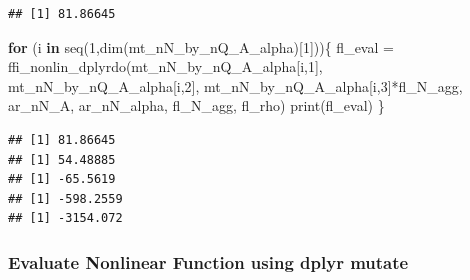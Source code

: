 \documentclass[
]{book}
\newenvironment{Shaded}{\begin{snugshade}}{\end{snugshade}}
\newcommand{\ControlFlowTok}[1]{\textcolor[rgb]{0.13,0.29,0.53}{\textbf{#1}}}
\newcommand{\DecValTok}[1]{\textcolor[rgb]{0.00,0.00,0.81}{#1}}
\newcommand{\FunctionTok}[1]{\textcolor[rgb]{0.00,0.00,0.00}{#1}}
\newcommand{\NormalTok}[1]{#1}
\newcommand{\OtherTok}[1]{\textcolor[rgb]{0.56,0.35,0.01}{#1}}
\newcommand{\SpecialCharTok}[1]{\textcolor[rgb]{0.00,0.00,0.00}{#1}}
\begin{document}
\begin{verbatim}
## [1] 81.86645
\end{verbatim}

\begin{Shaded}
\begin{Highlighting}[]
\ControlFlowTok{for}\NormalTok{ (i }\ControlFlowTok{in} \FunctionTok{seq}\NormalTok{(}\DecValTok{1}\NormalTok{,}\FunctionTok{dim}\NormalTok{(mt\_nN\_by\_nQ\_A\_alpha)[}\DecValTok{1}\NormalTok{]))\{}
\NormalTok{  fl\_eval }\OtherTok{=} \FunctionTok{ffi\_nonlin\_dplyrdo}\NormalTok{(mt\_nN\_by\_nQ\_A\_alpha[i,}\DecValTok{1}\NormalTok{],}
\NormalTok{                               mt\_nN\_by\_nQ\_A\_alpha[i,}\DecValTok{2}\NormalTok{],}
\NormalTok{                               mt\_nN\_by\_nQ\_A\_alpha[i,}\DecValTok{3}\NormalTok{]}\SpecialCharTok{*}\NormalTok{fl\_N\_agg,}
\NormalTok{                               ar\_nN\_A, ar\_nN\_alpha, fl\_N\_agg, fl\_rho)}
  \FunctionTok{print}\NormalTok{(fl\_eval)}
\NormalTok{\}}
\end{Highlighting}
\end{Shaded}

\begin{verbatim}
## [1] 81.86645
## [1] 54.48885
## [1] -65.5619
## [1] -598.2559
## [1] -3154.072
\end{verbatim}

\hypertarget{evaluate-nonlinear-function-using-dplyr-mutate}{%
\subsubsection{Evaluate Nonlinear Function using dplyr mutate}\label{evaluate-nonlinear-function-using-dplyr-mutate}}
\end{document}
